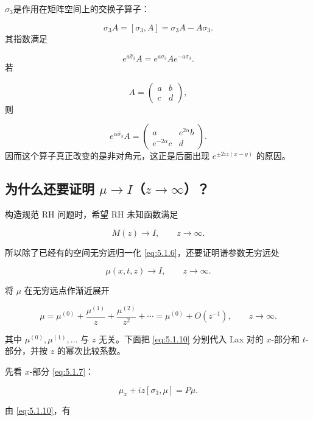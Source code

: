 \documentclass[
    lang=cn,
    scheme=chinese,
    mode=simple,
    device=normal,
    color=blue,
    math=cm,
    thmcnt=section,
    12pt,
    nowatermark
]{elegantbook}
\begin{document}
\begin{callout}
    $\widehat{\sigma}_3$是作用在矩阵空间上的交换子算子：

    \[
        \widehat{\sigma}_3A=[\sigma_3,A]=\sigma_3A-A\sigma_3.
    \]
    其指数满足

    \[
        e^{a\widehat{\sigma}_3}A
        =
        e^{a\sigma_3}Ae^{-a\sigma_3}.
    \]
    若

    \[
        A=\begin{pmatrix}a&b\\c&d\end{pmatrix},
    \]
    则

    \[
        e^{\alpha\widehat{\sigma}_3}A
        =
        \begin{pmatrix}
            a             & e^{2\alpha}b \\
            e^{-2\alpha}c & d
        \end{pmatrix}.
    \]
    因而这个算子真正改变的是非对角元，这正是后面出现 $e^{\pm2iz(x-y)}$ 的原因。
\end{callout}

\subsection{为什么还要证明 \texorpdfstring{$\mu\to I$}{μ → I}（\texorpdfstring{$z\to\infty$}{z → ∞}）？}

构造规范 RH 问题时，希望 RH 未知函数满足

\[
    M(z)\to I,\qquad z\to\infty.
\]

所以除了已经有的空间无穷远归一化 \eqref{eq:5.1.6}，还要证明谱参数无穷远处

\[
    \mu(x,t,z)\to I,\qquad z\to\infty.
\]

将 $\mu$ 在无穷远点作渐近展开

\begin{equation}
    \mu
    =
    \mu^{(0)}
    +\dfrac{\mu^{(1)}}{z}
    +\dfrac{\mu^{(2)}}{z^2}
    +\cdots
    =
    \mu^{(0)}+O(z^{-1}),
    \qquad z\to\infty.
    \tag{5.1.10}
    \label{eq:5.1.10}
\end{equation}

其中 $\mu^{(0)},\mu^{(1)},\ldots$ 与 $z$ 无关。下面把 \eqref{eq:5.1.10} 分别代入 Lax 对的 $x$-部分和 $t$-部分，并按 $z$ 的幂次比较系数。

先看 $x$-部分 \eqref{eq:5.1.7}：

\[
    \mu_x+iz[\sigma_3,\mu]=P\mu.
\]

由 \eqref{eq:5.1.10}，有
\end{document}
